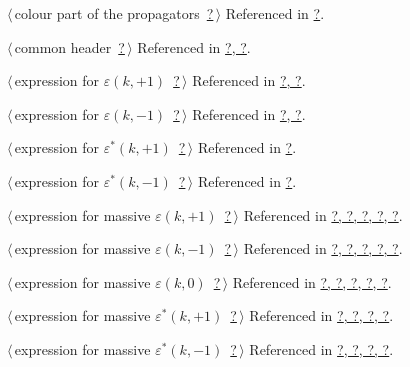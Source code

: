 \documentclass[a4paper,12pt]{amsart}
\renewcommand{\NWlink}[2]{\hyperlink{#1}{#2}}
\renewcommand{\NWtxtRefIn}{Referenced in}
\begin{document}
{\small\begin{list}{}{\setlength{\itemsep}{-\parsep}\setlength{\itemindent}{-\leftmargin}}
\item $\langle\,$colour part of the propagators\nobreak\ {\footnotesize \NWlink{nuweb?}{?}}$\,\rangle$ {\footnotesize {\NWtxtRefIn} \NWlink{nuweb?}{?}.}
\item $\langle\,$common header\nobreak\ {\footnotesize \NWlink{nuweb?}{?}}$\,\rangle$ {\footnotesize {\NWtxtRefIn} \NWlink{nuweb?}{?}\NWlink{nuweb?}{, ?}.
}
\item $\langle\,$expression for $\varepsilon(k, +1)$\nobreak\ {\footnotesize \NWlink{nuweb?}{?}}$\,\rangle$ {\footnotesize {\NWtxtRefIn} \NWlink{nuweb?}{?}\NWlink{nuweb?}{, ?}.
}
\item $\langle\,$expression for $\varepsilon(k, -1)$\nobreak\ {\footnotesize \NWlink{nuweb?}{?}}$\,\rangle$ {\footnotesize {\NWtxtRefIn} \NWlink{nuweb?}{?}\NWlink{nuweb?}{, ?}.
}
\item $\langle\,$expression for $\varepsilon^\ast(k, +1)$\nobreak\ {\footnotesize \NWlink{nuweb?}{?}}$\,\rangle$ {\footnotesize {\NWtxtRefIn} \NWlink{nuweb?}{?}.}
\item $\langle\,$expression for $\varepsilon^\ast(k, -1)$\nobreak\ {\footnotesize \NWlink{nuweb?}{?}}$\,\rangle$ {\footnotesize {\NWtxtRefIn} \NWlink{nuweb?}{?}.}
\item $\langle\,$expression for massive $\varepsilon(k, +1)$\nobreak\ {\footnotesize \NWlink{nuweb?}{?}}$\,\rangle$ {\footnotesize {\NWtxtRefIn} \NWlink{nuweb?}{?}\NWlink{nuweb?}{, ?}\NWlink{nuweb?}{, ?}\NWlink{nuweb?}{, ?}\NWlink{nuweb?}{, ?}.
}
\item $\langle\,$expression for massive $\varepsilon(k, -1)$\nobreak\ {\footnotesize \NWlink{nuweb?}{?}}$\,\rangle$ {\footnotesize {\NWtxtRefIn} \NWlink{nuweb?}{?}\NWlink{nuweb?}{, ?}\NWlink{nuweb?}{, ?}\NWlink{nuweb?}{, ?}\NWlink{nuweb?}{, ?}.
}
\item $\langle\,$expression for massive $\varepsilon(k, 0)$\nobreak\ {\footnotesize \NWlink{nuweb?}{?}}$\,\rangle$ {\footnotesize {\NWtxtRefIn} \NWlink{nuweb?}{?}\NWlink{nuweb?}{, ?}\NWlink{nuweb?}{, ?}\NWlink{nuweb?}{, ?}\NWlink{nuweb?}{, ?}.
}
\item $\langle\,$expression for massive $\varepsilon^\ast(k, +1)$\nobreak\ {\footnotesize \NWlink{nuweb?}{?}}$\,\rangle$ {\footnotesize {\NWtxtRefIn} \NWlink{nuweb?}{?}\NWlink{nuweb?}{, ?}\NWlink{nuweb?}{, ?}\NWlink{nuweb?}{, ?}.
}
\item $\langle\,$expression for massive $\varepsilon^\ast(k, -1)$\nobreak\ {\footnotesize \NWlink{nuweb?}{?}}$\,\rangle$ {\footnotesize {\NWtxtRefIn} \NWlink{nuweb?}{?}\NWlink{nuweb?}{, ?}\NWlink{nuweb?}{, ?}\NWlink{nuweb?}{, ?}.
}
\end{list}}
\end{document}
